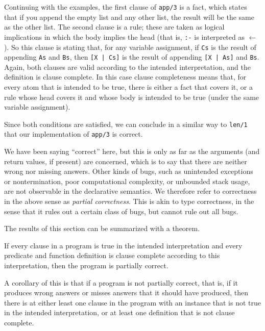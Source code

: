 Continuing with the examples,
the first clause of \texttt{app/3} is a fact, which states that
if you append the empty list and any other list,
the result will be the same as the other list.
The second clause is a rule;
these are taken as logical implications
in which the body implies the head
(that is, \texttt{:-} is interpreted as $\leftarrow$).
So this clause is stating that, for any variable assignment,
if \texttt{Cs} is the result of appending \texttt{As} and \texttt{Bs},
then \texttt{[X | Cs]} is the result of
appending \texttt{[X | As]} and \texttt{Bs}.
Again, both clauses are valid according to the intended interpretation,
and the definition is clause complete.
In this case clause completeness means that,
for every atom that is intended to be true,
there is either a fact that covers it,
or a rule whose head covers it and
whose body is intended to be true
(under the same variable assignment).

Since both conditions are satisfied,
we can conclude in a similar way to \texttt{len/1}
that our implementation of \texttt{app/3} is correct.

We have been saying ``correct'' here,
but this is only as far as the arguments
(and return values, if present)
are concerned,
which is to say that there are neither wrong nor missing answers.
Other kinds of bugs,
such as \mbox{unintended} exceptions or nontermination,
poor computational complexity,
or unbounded stack usage,
are not observable in the declarative semantics.
We therefore refer to correctness in the above sense
as \emph{partial correctness\label{gi:partial-correctness}}.
This is akin to type correctness,
in the sense that it rules out a certain class of bugs,
but cannot rule out all bugs.

The results of this section can be summarized with a theorem.

\begin{theorem} \label{thm:partial-correctness}
If every clause in a program is true in the intended interpretation
and every predicate and function definition is clause complete
according to this interpretation,
then the program is partially correct.
\end{theorem}

\noindent
A corollary of this is that if a program is not partially correct,
that is, if it produces wrong answers
or misses answers that it should have produced,
then there is at either least one clause in the program
with an instance that is not true in the intended interpretation,
or at least one definition that is not clause complete.


